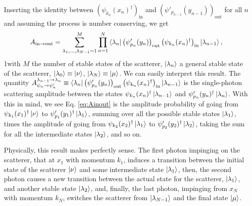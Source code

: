 \documentclass[notitlepage, prx, preprint, amsmath,superscriptaddress,amssymb]{revtex4-1}
\begin{document}
Inserting the identity between $\left(\psi_{k_n}(x_n)^\dagger\right)_\text{in}$ and $\left(\psi'_{p_{n-1}}(y_{n-1})\right)_\text{out}$ for all $n$ and assuming the process is number conserving, we get
\begin{equation}\label{eq:Ainout}
A_{\text{in}\to\text{out}}= \sum_{\lambda_1,\dots,\lambda_{N-1}=1}^M \prod_{n=1}^N \bra{\lambda_n} \left(\psi'_{p_n}(y_n)\right)_\text{out}\left(\psi_{k_n}(x_n)^\dagger\right)_\text{in}\ket{\lambda_{n-1}},
\end{equation}
1with $M$ the number of stable states of the scatterer, $\ket{\lambda_n}$ a general stable state of the scatterer, $\ket{\lambda_0}\equiv \ket{\nu}$, $\ket{\lambda_N}\equiv \ket{\mu}$. We can easily interpret this result. The quantity $A_{\psi_n\to\psi'_n}^{\lambda_{n-1}\to\lambda_n} \equiv \bra{\lambda_n} \left(\psi'_{p_n}(y_n)\right)_\text{out}\left(\psi_{k_n}(x_n)^\dagger\right)_\text{in}\ket{\lambda_{n-1}}$ is the single-photon scattering amplitude between the states $\psi_{k_n}(x_n)^\dagger\ket{\lambda_{n-1}}$ and $\psi'_{p_n}(y_n)^\dagger\ket{\lambda_n}$. With this in mind, we see Eq. \eqref{eq:Ainout} is the amplitude probability of going from $\psi_{k_1}(x_1)^\dagger\ket{\nu}$ to $\psi'_{p_1}(y_1)^\dagger\ket{\lambda_1}$, summing over all the possible stable states $\ket{\lambda_1}$, times the amplitude of going from $\psi_{k_2}(x_2)^\dagger\ket{\lambda_1}$ to $\psi'_{p_2}(y_2)^\dagger\ket{\lambda_2}$, taking the sum for all the intermediate states $\ket{\lambda_2}$, and so on.

Physically, this result makes perfectly sense. The first photon impinging on the scatterer, that at $x_1$ with momentum $k_1$, induces a transition between the initial state of the scatterer $\ket{\nu}$ and some intermediate state $\ket{\lambda_1}$, then, the second photon causes a new transition between the actual state for the scatterer, $\ket{\lambda_1}$, and another stable state $\ket{\lambda_2}$, and, finally, the last photon, impinging from $x_N$ with momentum $k_N$, switches the scatterer from $\ket{\lambda_{N-1}}$ and the final state $\ket{\mu}$.
\end{document}
